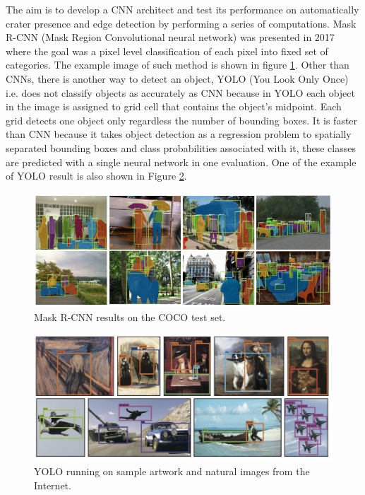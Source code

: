 \documentclass[11pt]{article}
\begin{document}
The aim is to develop a CNN architect and test its performance on automatically crater presence and edge detection by performing a series of computations. Mask R-CNN (Mask Region Convolutional neural network) was presented in 2017 where the goal was a pixel level classification of each pixel into fixed set of categories. The example image of such method is shown in figure \ref{fig:Mask R-CNN results on the COCO test set.}. Other than CNNs, there is another way to detect an object, YOLO (You Look Only Once) i.e. does not classify objects as accurately as CNN because in YOLO each object in the image is assigned to grid cell that contains the object's midpoint. Each grid detects one object only regardless the number of bounding boxes. It is faster than CNN because it takes object detection as a regression problem to spatially separated bounding boxes and class probabilities associated with it, these classes are predicted with a single neural network in one evaluation. One of the example of YOLO result is also shown in Figure  \ref{fig:YOLO running on sample artwork and natural images from the internet.}.

\begin{figure}[H]
	\includegraphics[width=\linewidth]{files/mask_R-CNN/results.jpg}
	\caption{Mask R-CNN results on the COCO test set.}
	\label{fig:Mask R-CNN results on the COCO test set.}
\end{figure} 

\begin{figure}[H]
	\includegraphics[width=\linewidth]{files/yolo/results.jpg}
	\caption{YOLO running on sample artwork and natural images from the Internet.}
	\label{fig:YOLO running on sample artwork and natural images from the internet.}
\end{figure}
\end{document}

